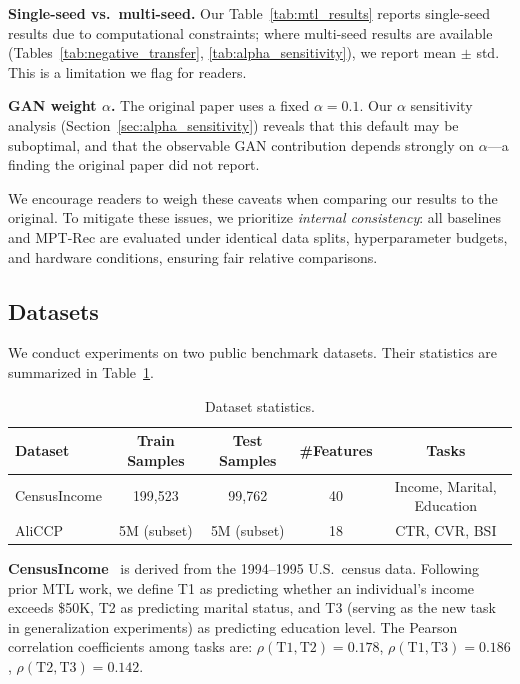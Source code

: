 \documentclass[review,anonymous]{acmart}
\begin{document}
\textbf{Single-seed vs.\ multi-seed.} Our Table~\ref{tab:mtl_results} reports
single-seed results due to computational constraints; where multi-seed results
are available (Tables~\ref{tab:negative_transfer}, \ref{tab:alpha_sensitivity}),
we report mean $\pm$ std. This is a limitation we flag for readers.

\textbf{GAN weight $\alpha$.} The original paper uses a fixed $\alpha=0.1$. Our
$\alpha$ sensitivity analysis (Section~\ref{sec:alpha_sensitivity}) reveals that
this default may be suboptimal, and that the observable GAN contribution depends
strongly on $\alpha$---a finding the original paper did not report.

We encourage readers to weigh these caveats when comparing our results to the
original. To mitigate these issues, we prioritize \emph{internal consistency}:
all baselines and MPT-Rec are evaluated under identical data splits,
hyperparameter budgets, and hardware conditions, ensuring fair relative
comparisons.

\subsection{Datasets}

We conduct experiments on two public benchmark datasets. Their statistics are
summarized in Table~\ref{tab:datasets}.

\begin{table}[t]
  \centering
  \caption{Dataset statistics.}
  \label{tab:datasets}
  \begin{tabular}{lcccc}
    \toprule
    \textbf{Dataset} & \textbf{Train Samples} & \textbf{Test Samples} & \textbf{\#Features} & \textbf{Tasks} \\
    \midrule
	    CensusIncome & 199,523 & 99,762 & 40 & Income, Marital, Education \\
	    AliCCP & 5M (subset) & 5M (subset) & 18 & CTR, CVR, BSI \\
    \bottomrule
  \end{tabular}
\end{table}

\textbf{CensusIncome}~\cite{asuncion2007uci} is derived from the 1994--1995 U.S.\
census data. Following prior MTL work, we define T1 as predicting whether an
individual's income exceeds \$50K, T2 as predicting marital status, and T3
(serving as the new task in generalization experiments) as predicting education
level. The Pearson correlation coefficients among tasks are: $\rho(\text{T1},
\text{T2}) = 0.178$, $\rho(\text{T1}, \text{T3}) = 0.186$, $\rho(\text{T2},
\text{T3}) = 0.142$.
\end{document}
